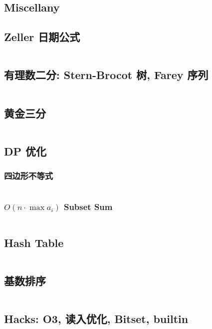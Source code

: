 \documentclass[titlepage, a4paper]{article}
\begin{document}
\begin{multicols}{2}
\begin{spacing}{0.6}
			\section{Miscellany}
				\subsection{Zeller 日期公式}
					\inputminted{cpp}{src/Miscellany/日期公式.cpp}
				\subsection{有理数二分: Stern-Brocot 树, Farey 序列}
					\inputminted{python}{src/yzh/farey.py}
				\subsection{黄金三分}
					\inputminted{cpp}{src/yzh/golden_ternary.cpp}
				\subsection{DP 优化}
				\subsubsection{四边形不等式}
					\inputminted{cpp}{src/Miscellany/2D1D.cpp}
					
				\subsubsection{$O(n \cdot \max a_i)$ Subset Sum}
					\inputminted{cpp}{src/yzh/Subset Sum.cpp}

				\newpage
				\subsection{Hash Table}
					\inputminted[highlightlines={4,15,17,18}]{cpp}{src/DataStructure/hashmap.cpp}
				\subsection{基数排序}
					\inputminted{cpp}{src/Miscellany/RadixSort.cpp}
				\subsection{Hacks: O3, 读入优化, Bitset, builtin}
					\inputminted{cpp}{src/Miscellany/hack.cpp}

\end{spacing}
\end{multicols}
\end{document}
